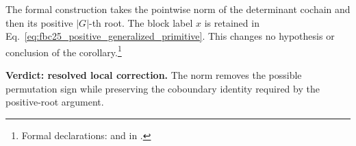 \documentclass{article}
\begin{document}
The formal construction takes the pointwise norm of the determinant cochain
and then its positive $|G|$-th root. The block label $x$ is retained in
Eq.~\ref{eq:fbc25_positive_generalized_primitive}. This changes no hypothesis
or conclusion of the corollary.\footnote{Formal declarations:
 and
 in
.}

\textbf{Verdict: resolved local correction.}
The norm removes the possible permutation sign while preserving the
coboundary identity required by the positive-root argument.



\end{document}
